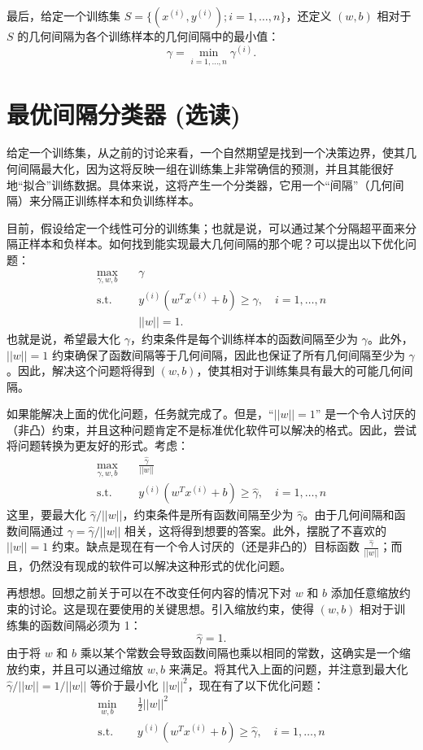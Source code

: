 最后，给定一个训练集 $S = \{(x^{(i)}, y^{(i)}); i = 1, \dots, n\}$，还定义 $(w,b)$ 相对于 $S$ 的几何间隔为各个训练样本的几何间隔中的最小值：
\[
    \gamma = \min_{i=1,\dots,n} \gamma^{(i)}.
\]

\section{最优间隔分类器 (选读)}

给定一个训练集，从之前的讨论来看，一个自然期望是找到一个决策边界，使其几何间隔最大化，因为这将反映一组在训练集上非常确信的预测，并且其能很好地“拟合”训练数据。具体来说，这将产生一个分类器，它用一个“间隔”（几何间隔）来分隔正训练样本和负训练样本。

目前，假设给定一个线性可分的训练集；也就是说，可以通过某个分隔超平面来分隔正样本和负样本。如何找到能实现最大几何间隔的那个呢？可以提出以下优化问题：
\begin{align*}
    \max_{\gamma, w, b} \quad &\gamma\\
    \text{s.t.} & y^{(i)}(w^T x^{(i)} + b) \ge \gamma, \quad i = 1, \dots, n\\
    &||w|| = 1.
\end{align*}
也就是说，希望最大化 $\gamma$，约束条件是每个训练样本的函数间隔至少为 $\gamma$。此外，$||w|| = 1$ 约束确保了函数间隔等于几何间隔，因此也保证了所有几何间隔至少为 $\gamma$。因此，解决这个问题将得到 $(w,b)$，使其相对于训练集具有最大的可能几何间隔。

如果能解决上面的优化问题，任务就完成了。但是，“$||w|| = 1$” 是一个令人讨厌的（非凸）约束，并且这种问题肯定不是标准优化软件可以解决的格式。因此，尝试将问题转换为更友好的形式。考虑：
\begin{align*}
    \max_{\gamma, w, b} \quad &\frac{\hat\gamma}{||w||}\\
    \text{s.t.} \quad & y^{(i)}(w^T x^{(i)} + b) \ge \hat\gamma, \quad i = 1, \dots, n
\end{align*}
这里，要最大化 $\hat{\gamma}/||w||$，约束条件是所有函数间隔至少为 $\hat{\gamma}$。由于几何间隔和函数间隔通过 $\gamma = \hat{\gamma}/||w||$ 相关，这将得到想要的答案。此外，摆脱了不喜欢的 $||w|| = 1$ 约束。缺点是现在有一个令人讨厌的（还是非凸的）目标函数 $\frac{\hat{\gamma}}{||w||}$；而且，仍然没有现成的软件可以解决这种形式的优化问题。

再想想。回想之前关于可以在不改变任何内容的情况下对 $w$ 和 $b$ 添加任意缩放约束的讨论。这是现在要使用的关键思想。引入缩放约束，使得 $(w,b)$ 相对于训练集的函数间隔必须为 1：
\[
    \hat{\gamma} = 1.
\]
由于将 $w$ 和 $b$ 乘以某个常数会导致函数间隔也乘以相同的常数，这确实是一个缩放约束，并且可以通过缩放 $w, b$ 来满足。将其代入上面的问题，并注意到最大化 $\hat{\gamma}/||w|| = 1/||w||$ 等价于最小化 $||w||^2$，现在有了以下优化问题：
\begin{align*}
    \min_{w, b} \quad &\frac{1}{2}||w||^2\\
    \text{s.t.} \quad & y^{(i)}(w^T x^{(i)} + b) \ge \hat\gamma, \quad i = 1, \dots, n
\end{align*}

